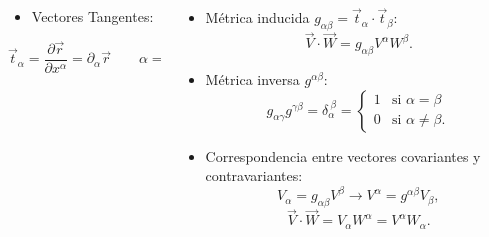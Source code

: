 \documentclass[xcolor=dvipsnames]{beamer}
\begin{document}
\begin{frame}
  \begin{columns}[T]
    \begin{column}{5.2cm}
      \centering
      \begin{itemize}
      \item Vectores Tangentes:
      \end{itemize}
      \begin{figure}[h]
        \resizebox{\columnwidth}{!}{}
      \end{figure}
      \begin{equation*}
        \vec{t}_{\alpha}=\frac{\partial \vec{r}}{\partial
          x^{\alpha}}=\partial_{\alpha}\vec{r} \qquad \alpha=1,2;
      \end{equation*}
     
    \end{column}
    \begin{column}{6.2cm}
      \centering
      \begin{itemize}
\item Métrica inducida $g_{\alpha\beta}=\vec{t}_{\alpha}\cdot\vec{t}_{\beta}$:
      \begin{equation*}
      \vec{V}\cdot\vec{W}=g_{\alpha\beta}V^{\alpha}W^{\beta}.
      \end{equation*}
      \item Métrica inversa $g^{\alpha\beta}$:
      \begin{equation*}
       g_{\alpha\gamma}g^{\gamma\beta}= \delta_{\alpha}^{\ \beta}=\begin{cases}
          1&\text{si $\alpha=\beta$}\\
          0&\text{si $\alpha\neq\beta$}.
          \end{cases}
      \end{equation*}
      \item Correspondencia entre vectores covariantes y contravariantes:
      \begin{equation*}
        V_{\alpha}=g_{\alpha\beta}V^{\beta}\rightarrow V^{\alpha}=g^{\alpha\beta}V_{\beta}, 
      \end{equation*}
      \begin{equation*}
        \vec{V}\cdot\vec{W}=V_{\alpha}W^{\alpha}=V^{\alpha}W_{\alpha}.
      \end{equation*}
      \end{itemize}
    \end{column}
  \end{columns}
\end{frame}
\end{document}
